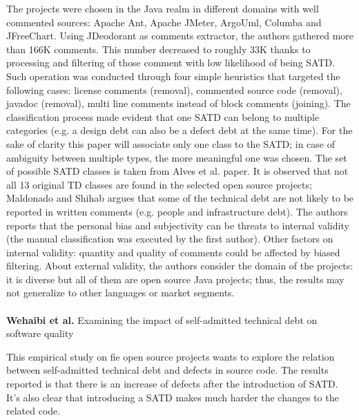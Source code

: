 The projects were chosen in the Java realm in different domains with well commented sources: Apache Ant, Apache JMeter, ArgoUml, Columba and JFreeChart. 
Using JDeodorant as comments extractor, the authors gathered more than 166K comments. This number decreased to roughly 33K thanks to processing and filtering of those comment with low likelihood of being SATD. Such operation was conducted through four simple heuristics that targeted the following cases: license comments (removal), commented source code (removal), javadoc (removal), multi line comments instead of block comments (joining). 
The classification process made evident that one SATD can belong to multiple categories (e.g. a design debt can also be a defect debt at the same time). For the sake of clarity this paper will associate only one class to the SATD; in case of ambiguity between multiple types, the more meaningful one was chosen. 
The set of possible SATD classes is taken from Alves et al. \cite{alves2014towards} paper. It is observed that not all 13 original TD classes are found in the selected open source projects; Maldonado and Shihab argues that some of the technical debt are not likely to be reported in written comments (e.g. people and infrastructure debt).
The authors reports that the personal bias and subjectivity can be threats to internal validity (the manual classification was executed by the first author). Other factors on internal validity: quantity and quality of comments could be affected by biased filtering.
About external validity, the authors consider the domain of the projects: it is diverse but all of them are open source Java projects; thus,  the results may not generalize to other languages or market segments.
\\
\\
\textbf{Wehaibi et al.} \cite{wehaibi2016examining} Examining the impact of self-admitted technical debt on software quality

This empirical study on fie open source projects wants to explore the relation between self-admitted technical debt and defects in source code. The results reported is that there is an increase of defects after the introduction of SATD. It's also clear that introducing a SATD makes much harder the changes to the related code.
\\
\\